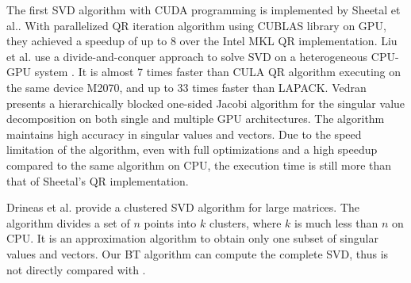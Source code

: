 The first SVD algorithm with CUDA programming is implemented by Sheetal et al.\cite{09IPDPSQR}. With parallelized QR iteration algorithm using CUBLAS library on GPU, they achieved a speedup of up to 8 over the Intel MKL QR implementation.
Liu et al. use a divide-and-conquer approach to solve SVD on a heterogeneous CPU-GPU system \cite{13CFDC}.
It is almost 7 times faster than CULA QR algorithm executing on the same device M2070, and up to 33 times faster than LAPACK.
Vedran\cite{14arxivjacobi} presents a hierarchically blocked one-sided Jacobi algorithm for the singular value decomposition on both single and multiple GPU architectures. 
The algorithm maintains high accuracy in singular values and vectors. Due to the speed limitation of the algorithm, even with full optimizations and a high speedup compared to the same algorithm on CPU, the execution time is still more than that of Sheetal's QR implementation.

Drineas et al. \cite{99clustering} provide a clustered SVD algorithm for large matrices. The algorithm divides a set of $n$ points into $k$ clusters, where $k$ is much less than $n$ on CPU.
It is an approximation algorithm to obtain only one subset of singular values
and vectors. Our BT algorithm can compute the complete SVD, thus is not
directly compared with \cite{99clustering}. 

